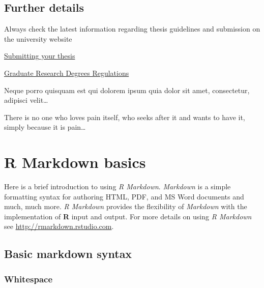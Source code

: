 \documentclass[a4paper, nobind]{templates/ociamthesis}
\begin{document}
\hypertarget{further-details}{%
\section*{Further details}\label{further-details}}

Always check the latest information regarding thesis guidelines and submission on the university website

\href{https://www.murdoch.edu.au/mymurdoch/support-advice/graduate-research-students/submitting-your-thesis}{Submitting your thesis}

\href{https://policy.murdoch.edu.au/docview/?docid=2278\&public=true}{Graduate Research Degrees Regulations}

\begin{savequote}
Neque porro quisquam est qui dolorem ipsum quia dolor sit amet,
consectetur, adipisci velit\ldots{}

There is no one who loves pain itself, who seeks after it and wants to
have it, simply because it is pain\ldots{}
\end{savequote}



\hypertarget{rmd-basics}{%
\chapter{R Markdown basics}\label{rmd-basics}}

\minitoc 

\noindent Here is a brief introduction to using \emph{R Markdown}.
\emph{Markdown} is a simple formatting syntax for authoring HTML, PDF, and MS Word documents and much, much more.
\emph{R Markdown} provides the flexibility of \emph{Markdown} with the implementation of \textbf{R} input and output. For more details on using \emph{R Markdown} see \url{http://rmarkdown.rstudio.com}.

\hypertarget{basic-markdown-syntax}{%
\section{Basic markdown syntax}\label{basic-markdown-syntax}}

\hypertarget{whitespace}{%
\subsection{Whitespace}\label{whitespace}}
\end{document}
